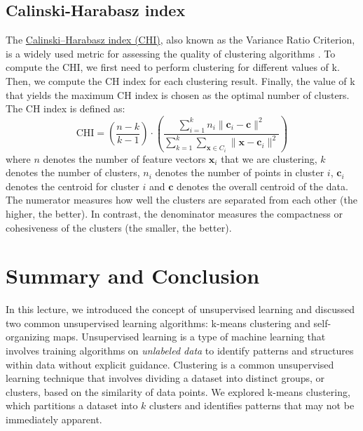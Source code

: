 \documentclass{article}[11pt]
\begin{document}
\subsection{Calinski-Harabasz index}
The \href{https://en.wikipedia.org/wiki/Calinski%E2%80%93Harabasz_index}{Calinski–Harabasz index (CHI)}, also known as the Variance Ratio Criterion, 
is a widely used metric for assessing the quality of clustering algorithms \citep{Caliski01011974}. To compute the CHI, we first need to perform clustering for different values of k. 
Then, we compute the CH index for each clustering result. Finally, the value of k that yields the maximum CH index is chosen as the optimal number of clusters. The CH index is defined as:
\begin{equation}
\text{CHI} = \left(\frac{n-k}{k-1}\right)\cdot\left(\frac{\sum_{i=1}^{k}n_{i}\lVert{\mathbf{c}_{i}-\mathbf{c}}\rVert^{2}}{\sum_{k=1}^{k}\sum_{\mathbf{x}\in{C_{i}}}\lVert{\mathbf{x}-\mathbf{c}_{i}}\rVert^{2}}\right)
\end{equation}
where $n$ denotes the number of feature vectors $\mathbf{x}_{i}$ that we are clustering, $k$ denotes the number of clusters, $n_{i}$ denotes the number of points in cluster $i$, $\mathbf{c}_{i}$ denotes the centroid for cluster $i$ and $\mathbf{c}$ denotes the overall centroid of the data. 
The numerator measures how well the clusters are separated from each other (the higher, the better). In contrast, the denominator measures the compactness or cohesiveness of the clusters (the smaller, the better).


\section{Summary and Conclusion}
In this lecture, we introduced the concept of unsupervised learning and discussed two common unsupervised learning algorithms: k-means clustering and self-organizing maps.
Unsupervised learning is a type of machine learning that involves training algorithms on \textit{unlabeled data} to identify patterns and structures within data without explicit guidance.
Clustering is a common unsupervised learning technique that involves dividing a dataset into distinct groups, or clusters, based on the similarity of data points.
We explored k-means clustering, which partitions a dataset into $k$ clusters and identifies patterns that may not be immediately apparent.


\end{document}

